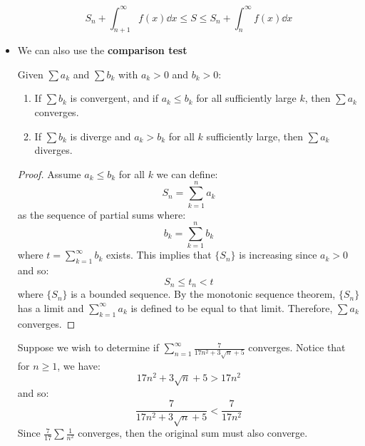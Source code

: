 \begin{itemize}
    \begin{equation}
        S_n + \int_{n+1}^\infty f(x) \dd{x} \le S \le S_n + \int_n^{\infty} f(x) \dd{x}
    \end{equation}
    \item We can also use the \textbf{comparison test}
    \begin{theorem}
        Given $\sum a_k$ and $\sum b_k$ with $a_k > 0 $ and $b_k > 0$:
        \begin{enumerate}
            \item If $\sum b_k$ is convergent, and if $a_k \le b_k$ for all sufficiently large $k$, then $\sum a_k$ converges.
            \item If $\sum b_k$ is diverge and $a_k > b_k$ for all $k$ sufficiently large, then $\sum a_k$ diverges.
        \end{enumerate}
    \end{theorem}
    \begin{proof}
        Assume $a_k \le b_k$ for all $k$ we can define:
        \begin{equation}
            S_n = \sum_{k=1}^n a_k
        \end{equation}
        as the sequence of partial sums where:
        \begin{equation}
            b_k = \sum_{k=1}^n b_k
        \end{equation}
        where $t=\sum_{k=1}^\infty b_k$ exists. This implies that $\{S_n\}$ is increasing since $a_k > 0$ and so:
        \begin{equation}
            S_n \le t_n < t
        \end{equation}
        where $\{S_n\}$ is a bounded sequence. By the monotonic sequence theorem, $\{S_n\}$ has a limit and $\sum_{k=1}^\infty a_k$ is defined to be equal to that limit. Therefore, $\sum a_k$ converges.
    \end{proof}
    \begin{example}
        Suppose we wish to determine if $\sum_{n=1}^\infty \frac{7}{17n^2+3\sqrt{n}+5}$ converges. Notice that for $n \ge 1$, we have:
        \begin{equation}
            17n^2+3\sqrt{n}+5 > 17n^2
        \end{equation}
        and so:
        \begin{equation}
            \frac{7}{17n^2+3\sqrt{n}+5} < \frac{7}{17n^2}
        \end{equation}
        Since $\frac{7}{17}\sum \frac{1}{n^2}$ converges, then the original sum must also converge.

\end{example}
\end{itemize}
